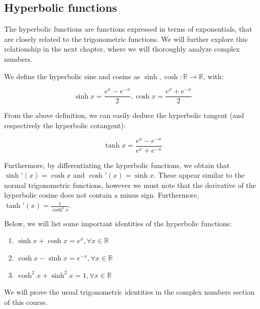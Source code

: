\documentclass[12pt]{article}
\begin{document}
\newpage

\subsection{Hyperbolic functions}

The hyperbolic functions are functions expressed in terms of exponentials, that are closely related to the trigonometric functions. We will further explore this relationship in the next chapter, where we will thoroughly analyze complex numbers.

\begin{definition}
    We define the hyperbolic sine and cosine as $\sinh, \cosh : \mathbb{R} \to \mathbb{R}$, with:

    \[ \sinh{x} = \frac{e^x - e^{-x}}{2}, \cosh{x} = \frac{e^x + e^{-x}}{2} \]
\end{definition}

From the above definition, we can easily deduce the hyperbolic tangent (and respectively the hyperbolic cotangent):

\[ \tanh{x} = \frac{e^x - e^{-x}}{e^x + e^{-x}} \]

Furthermore, by differentiating the hyperbolic functions, we obtain that $\sinh'(x) = \cosh{x}$ and $\cosh'(x) = \sinh{x}$. These appear similar to the normal trigonometric functions, however we must note that the derivative of the hyperbolic cosine does not contain a minus sign. Furthermore, $\tanh'(x) = \frac{1}{\cosh^2{x}}$.

Below, we will list some important identities of the hyperbolic functions:

\begin{enumerate}
    \item $\sinh{x} + \cosh{x} = e^x, \forall x \in \mathbb{R}$
    \item $\cosh{x} - \sinh{x} = e^{-x}, \forall x \in \mathbb{R}$
    \item $\cosh^2{x} + \sinh^2{x} = 1, \forall x \in \mathbb{R}$
\end{enumerate}

We will prove the usual trigonometric identities in the complex numbers section of this course.
\end{document}
